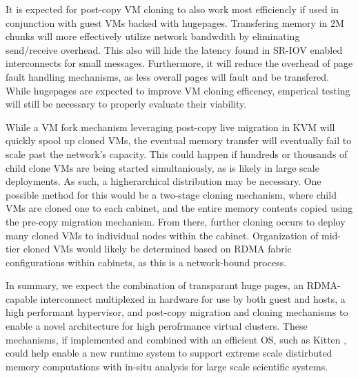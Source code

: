 It is expected for post-copy VM cloning to also work most efficiencly if used in conjunction with guest VMs backed with hugepages. Transfering memory in 2M chunks will more effectively utilize network bandwdith by eliminating send/receive overhead. This also will hide the latency found in SR-IOV enabled interconnects for small messages. Furthermore, it will reduce the overhead of page fault handling mechanisms, as less overall pages will fault and be transfered.  While hugepages are expected to improve VM cloning efficency, emperical testing will still be necessary to properly evaluate their viability.   

While a VM fork mechanism leveraging post-copy live migration in KVM will quickly spool up cloned VMs, the eventual memory transfer will eventually fail to scale past the network's capacity. This could happen if hundreds or thousands of child clone VMs are being started simultaniously, as is likely in large scale deployments. As such, a higherarchical distribution may be necessary. One possible method for this would be a two-stage cloning mechanism, where child VMs are cloned one to each cabinet, and the entire memory contents copied using the pre-copy migration mechanism. From there, further cloning occurs to deploy many cloned VMs to individual nodes within the cabinet. Organization of mid-tier cloned VMs would likely be determined based on RDMA fabric configurations within cabinets, as this is a network-bound process. 


In summary, we expect the combination of transparant huge pages, an RDMA-capable interconnect multiplexed in hardware for use by both guest and hosts, a high performant hypervisor, and post-copy migration and cloning mechanisms to enable a novel architecture for high perofrmance virtual clusters. These mechanisms, if implemented and combined with an efficient OS, such as Kitten \cite{pedretti2011kitten}, could help enable a new runtime system to support extreme scale distirbuted memory computations with in-situ analysis \cite{ahrens2010visualization, vishwanath2011toward} for large scale scientific systems. 




